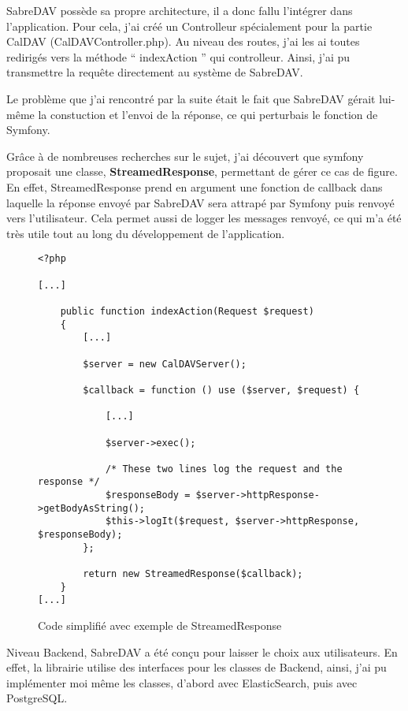 SabreDAV possède sa propre architecture, il a donc fallu l'intégrer dans l'application. Pour cela, j'ai créé un Controlleur spécialement pour la partie CalDAV (CalDAVController.php). Au niveau des routes, j'ai les ai toutes redirigés vers la méthode `` indexAction '' qui controlleur. Ainsi, j'ai pu transmettre la requête directement au système de SabreDAV.

Le problème que j'ai rencontré par la suite était le fait que SabreDAV gérait lui-même la constuction et l'envoi de la réponse, ce qui perturbais le fonction de Symfony.

Grâce à de nombreuses recherches sur le sujet, j'ai découvert que symfony proposait une classe, \textbf{StreamedResponse}, permettant de gérer ce cas de figure. En effet, StreamedResponse prend en argument une fonction de callback dans laquelle la réponse envoyé par SabreDAV sera attrapé par Symfony puis renvoyé vers l'utilisateur. Cela permet aussi de logger les messages renvoyé, ce qui m'a été très utile tout au long du développement de l'application.

\newpage

\begin{figure}[h]
\begin{lstlisting}[frame=single]
<?php

[...]

    public function indexAction(Request $request)
    {
        [...]

        $server = new CalDAVServer();

        $callback = function () use ($server, $request) {

            [...]

            $server->exec();

            /* These two lines log the request and the response */
            $responseBody = $server->httpResponse->getBodyAsString();
            $this->logIt($request, $server->httpResponse, $responseBody);
        };

        return new StreamedResponse($callback);
    }
[...]

\end{lstlisting}
\caption{Code simplifié avec exemple de StreamedResponse}
\end{figure}

Niveau Backend, SabreDAV a été conçu pour laisser le choix aux utilisateurs. En effet, la librairie utilise des interfaces pour les classes de Backend, ainsi, j'ai pu implémenter moi même les classes, d'abord avec ElasticSearch, puis avec PostgreSQL.

